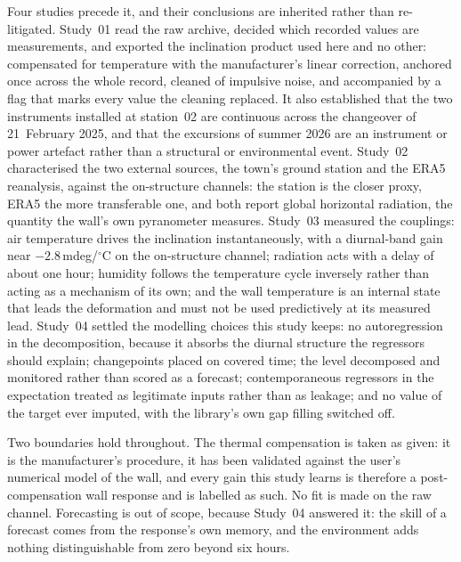 \documentclass[11pt,a4paper]{article}
\begin{document}
Four studies precede it, and their conclusions are inherited rather than
re-litigated. Study~01 read the raw archive, decided which recorded values are
measurements, and exported the inclination product used here and no other:
compensated for temperature with the manufacturer's linear correction,
anchored once across the whole record, cleaned of impulsive noise, and
accompanied by a flag that marks every value the cleaning replaced. It also
established that the two instruments installed at station~02 are continuous
across the changeover of 21~February 2025, and that the excursions of summer
2026 are an instrument or power artefact rather than a structural or
environmental event. Study~02 characterised the two external sources, the
town's ground station and the ERA5 reanalysis, against the on-structure
channels: the station is the closer proxy, ERA5 the more transferable one, and
both report global horizontal radiation, the quantity the wall's own
pyranometer measures. Study~03 measured the couplings: air temperature drives
the inclination instantaneously, with a diurnal-band gain near
$-2.8$\,mdeg/$^{\circ}$C on the on-structure channel; radiation acts with a
delay of about one hour; humidity follows the temperature cycle inversely
rather than acting as a mechanism of its own; and the wall temperature is an
internal state that leads the deformation and must not be used predictively at
its measured lead. Study~04 settled the modelling choices this study keeps: no
autoregression in the decomposition, because it absorbs the diurnal structure
the regressors should explain; changepoints placed on covered time; the level
decomposed and monitored rather than scored as a forecast; contemporaneous
regressors in the expectation treated as legitimate inputs rather than as
leakage; and no value of the target ever imputed, with the library's own gap
filling switched off.

Two boundaries hold throughout. The thermal compensation is taken as given: it
is the manufacturer's procedure, it has been validated against the user's
numerical model of the wall, and every gain this study learns is therefore a
post-compensation wall response and is labelled as such. No fit is made on the
raw channel. Forecasting is out of scope, because Study~04 answered it: the
skill of a forecast comes from the response's own memory, and the environment
adds nothing distinguishable from zero beyond six hours.
\end{document}
